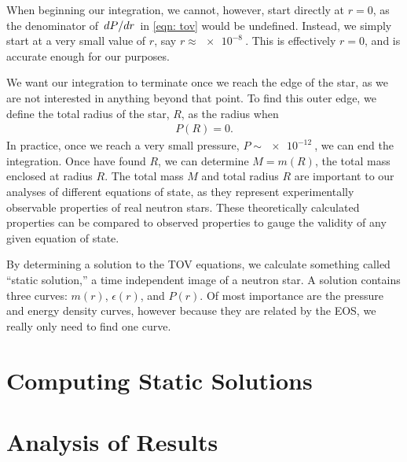 When beginning our integration, we cannot, however, start directly at $r=0$, as the denominator of $\dv*{P}{r}$ in \eqref{eqn: tov} would be undefined. Instead, we simply start at a very small value of $r$, say $r\approx\SI{e-8}{}$. This is effectively $r=0$, and is accurate enough for our purposes.

We want our integration to terminate once we reach the edge of the star, as we are not interested in anything beyond that point. To find this outer edge, we define the total radius of the star, $R$, as the radius when 
\begin{align}
    P(R) = 0.
\end{align}
In practice, once we reach a very small pressure, $P \sim \SI{e-12}{}$, we can end the integration. Once  have found $R$, we can determine $M = m(R)$, the total mass enclosed at radius $R$. The total mass $M$ and total radius $R$ are important to our analyses of different equations of state, as they represent experimentally observable properties of real neutron stars. These theoretically calculated properties can be compared to observed properties to gauge the validity of any given equation of state.

By determining a solution to the TOV equations, we calculate something called ``static solution,'' a time independent image of a neutron star. A solution contains three curves: $m(r)$, $\epsilon(r)$, and $P(r)$. Of most importance are the pressure and energy density curves, however because they are related by the EOS, we really only need to find one curve.





\section{Computing Static Solutions}

\section{Analysis of Results}
